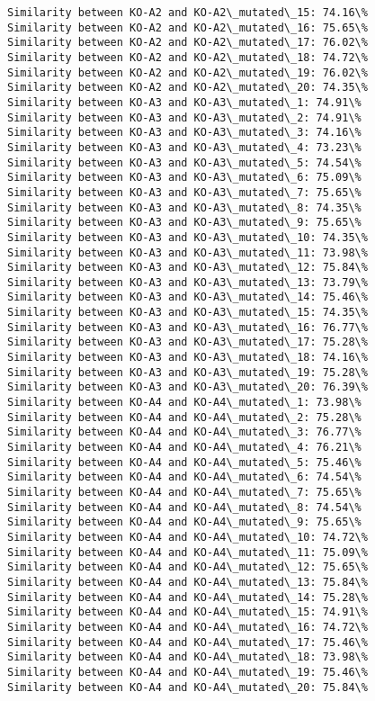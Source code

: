 \documentclass[11pt]{article}
\begin{document}
\begin{Verbatim}[commandchars=\\\{\}]
Similarity between KO-A2 and KO-A2\_mutated\_15: 74.16\%
Similarity between KO-A2 and KO-A2\_mutated\_16: 75.65\%
Similarity between KO-A2 and KO-A2\_mutated\_17: 76.02\%
Similarity between KO-A2 and KO-A2\_mutated\_18: 74.72\%
Similarity between KO-A2 and KO-A2\_mutated\_19: 76.02\%
Similarity between KO-A2 and KO-A2\_mutated\_20: 74.35\%
Similarity between KO-A3 and KO-A3\_mutated\_1: 74.91\%
Similarity between KO-A3 and KO-A3\_mutated\_2: 74.91\%
Similarity between KO-A3 and KO-A3\_mutated\_3: 74.16\%
Similarity between KO-A3 and KO-A3\_mutated\_4: 73.23\%
Similarity between KO-A3 and KO-A3\_mutated\_5: 74.54\%
Similarity between KO-A3 and KO-A3\_mutated\_6: 75.09\%
Similarity between KO-A3 and KO-A3\_mutated\_7: 75.65\%
Similarity between KO-A3 and KO-A3\_mutated\_8: 74.35\%
Similarity between KO-A3 and KO-A3\_mutated\_9: 75.65\%
Similarity between KO-A3 and KO-A3\_mutated\_10: 74.35\%
Similarity between KO-A3 and KO-A3\_mutated\_11: 73.98\%
Similarity between KO-A3 and KO-A3\_mutated\_12: 75.84\%
Similarity between KO-A3 and KO-A3\_mutated\_13: 73.79\%
Similarity between KO-A3 and KO-A3\_mutated\_14: 75.46\%
Similarity between KO-A3 and KO-A3\_mutated\_15: 74.35\%
Similarity between KO-A3 and KO-A3\_mutated\_16: 76.77\%
Similarity between KO-A3 and KO-A3\_mutated\_17: 75.28\%
Similarity between KO-A3 and KO-A3\_mutated\_18: 74.16\%
Similarity between KO-A3 and KO-A3\_mutated\_19: 75.28\%
Similarity between KO-A3 and KO-A3\_mutated\_20: 76.39\%
Similarity between KO-A4 and KO-A4\_mutated\_1: 73.98\%
Similarity between KO-A4 and KO-A4\_mutated\_2: 75.28\%
Similarity between KO-A4 and KO-A4\_mutated\_3: 76.77\%
Similarity between KO-A4 and KO-A4\_mutated\_4: 76.21\%
Similarity between KO-A4 and KO-A4\_mutated\_5: 75.46\%
Similarity between KO-A4 and KO-A4\_mutated\_6: 74.54\%
Similarity between KO-A4 and KO-A4\_mutated\_7: 75.65\%
Similarity between KO-A4 and KO-A4\_mutated\_8: 74.54\%
Similarity between KO-A4 and KO-A4\_mutated\_9: 75.65\%
Similarity between KO-A4 and KO-A4\_mutated\_10: 74.72\%
Similarity between KO-A4 and KO-A4\_mutated\_11: 75.09\%
Similarity between KO-A4 and KO-A4\_mutated\_12: 75.65\%
Similarity between KO-A4 and KO-A4\_mutated\_13: 75.84\%
Similarity between KO-A4 and KO-A4\_mutated\_14: 75.28\%
Similarity between KO-A4 and KO-A4\_mutated\_15: 74.91\%
Similarity between KO-A4 and KO-A4\_mutated\_16: 74.72\%
Similarity between KO-A4 and KO-A4\_mutated\_17: 75.46\%
Similarity between KO-A4 and KO-A4\_mutated\_18: 73.98\%
Similarity between KO-A4 and KO-A4\_mutated\_19: 75.46\%
Similarity between KO-A4 and KO-A4\_mutated\_20: 75.84\%

\end{Verbatim}
\end{document}
